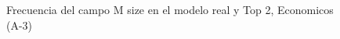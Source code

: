 \begin{figure}[H]
    \centering
    
    \caption{Frecuencia del campo M size en el modelo real y Top 2, Economicos (A-3)}
    \label{frecuency-M Size-top2}
\end{figure}